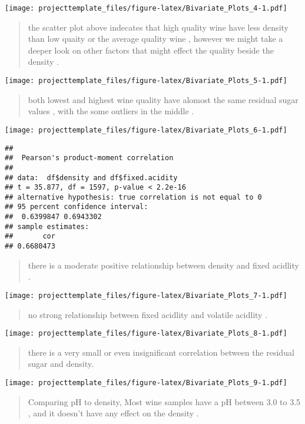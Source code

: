 \documentclass[]{article}
\begin{document}
\texttt{[image: projecttemplate\_files/figure-latex/Bivariate\_Plots\_4-1.pdf]}

\begin{quote}
the scatter plot above indecates that high quality wine have less
density than low quaity or the average quality wine , however we might
take a deeper look on other factors that might effect the quality beside
the density .
\end{quote}

\texttt{[image: projecttemplate\_files/figure-latex/Bivariate\_Plots\_5-1.pdf]}

\begin{quote}
both lowest and highest wine quality have alomost the same residual
sugar values , with the some outliers in the middle .
\end{quote}

\texttt{[image: projecttemplate\_files/figure-latex/Bivariate\_Plots\_6-1.pdf]}

\begin{verbatim}
## 
##  Pearson's product-moment correlation
## 
## data:  df$density and df$fixed.acidity
## t = 35.877, df = 1597, p-value < 2.2e-16
## alternative hypothesis: true correlation is not equal to 0
## 95 percent confidence interval:
##  0.6399847 0.6943302
## sample estimates:
##       cor 
## 0.6680473
\end{verbatim}

\begin{quote}
there is a moderate positive relationship between density and fixed
acidlity .
\end{quote}

\texttt{[image: projecttemplate\_files/figure-latex/Bivariate\_Plots\_7-1.pdf]}

\begin{quote}
no strong relationship between fixed acidlity and volatile acidlity .
\end{quote}

\texttt{[image: projecttemplate\_files/figure-latex/Bivariate\_Plots\_8-1.pdf]}

\begin{quote}
there is a very small or even insignificant correlation between the
residual sugar and density.
\end{quote}

\texttt{[image: projecttemplate\_files/figure-latex/Bivariate\_Plots\_9-1.pdf]}

\begin{quote}
Comparing pH to density, Most wine samples have a pH between 3.0 to 3.5
, and it doesn't have any effect on the density .
\end{quote}
\end{document}
